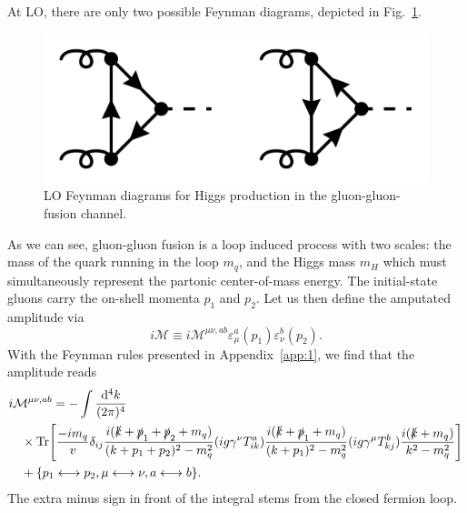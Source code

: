 At LO, there are only two possible Feynman diagrams, depicted in Fig.~\ref{fig:4:LO}.
\begin{figure}[ht]
\centering
\includegraphics[scale=0.2]{Images/LO.pdf}
\caption{\acs{LO} Feynman diagrams for Higgs production in the gluon-gluon-fusion channel.}
\label{fig:4:LO}
\end{figure}
As we can see, gluon-gluon fusion is a loop induced process with two scales: the mass of the quark running in the loop $m_q$, and the Higgs mass $m_H$ which must simultaneously represent the partonic center-of-mass energy. The initial-state gluons carry the on-shell momenta $p_1$ and $p_2$. Let us then define the amputated amplitude via
\begin{equation}
i\mathcal{M} \equiv i \mathcal{M}^{\mu\nu, ab} \varepsilon_\mu^a(p_1) \varepsilon_\nu^b(p_2).
\end{equation}
With the Feynman rules presented in Appendix~\ref{app:1}, we find that the amplitude reads
\begin{equation}
\begin{split}
&i \mathcal{M}^{\mu \nu, ab} = -\int \frac{\mathrm{d}^4 k}{(2\pi)^4}\, \\
&\quad \times \text{Tr}\!\left[ \frac{-i m_q}{v} \delta_{ij} \frac{i(\slashed{k} + \slashed{p}_1 + \slashed{p}_2 + m_q)}{(k + p_1 + p_2)^2 - m_q^2} (ig \gamma^\nu T^a_{ik}) \frac{i (\slashed{k} + \slashed{p}_1 + m_q)}{(k + p_1)^2 - m_q^2} (i g \gamma^\mu T^b_{kj}) \frac{i (\slashed{k} + m_q)}{k^2 - m_q^2} \right] \\
&\quad + \lbrace p_1 \longleftrightarrow p_2,  \mu \longleftrightarrow \nu, a \longleftrightarrow b \rbrace .
\label{eq:4:form_factor_amplitude}
\end{split}
\end{equation}
The extra minus sign in front of the integral stems from the closed fermion loop.

